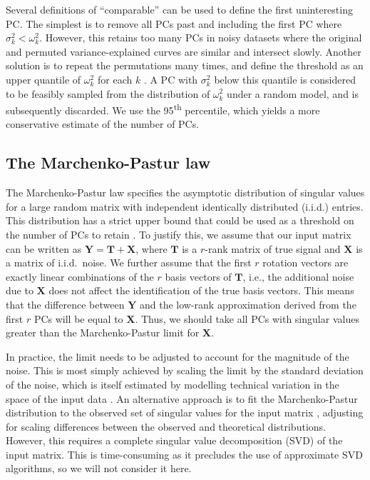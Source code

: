 \documentclass[10pt,letterpaper]{article}
\begin{document}
Several definitions of ``comparable'' can be used to define the first uninteresting PC.
The simplest is to remove all PCs past and including the first PC where $\sigma^2_k < \omega^2_k$.
However, this retains too many PCs in noisy datasets where the original and permuted variance-explained curves are similar and intersect slowly.
Another solution is to repeat the permutations many times, and define the threshold as an upper quantile of $\omega^2_k$ for each $k$ \cite{buja1992remarks}.
A PC with $\sigma^2_k$ below this quantile is considered to be feasibly sampled from the distribution of $\omega^2_k$ under a random model, and is subsequently discarded.
We use the 95\textsuperscript{th} percentile, which yields a more conservative estimate of the number of PCs.

\subsection{The Marchenko-Pastur law}
The Marchenko-Pastur law \cite{marchenko1967distribution} specifies the asymptotic distribution of singular values for a large random matrix with independent identically distributed (i.i.d.) entries.
This distribution has a strict upper bound that could be used as a threshold on the number of PCs to retain \cite{shekhar2016comprehensive}.
To justify this, we assume that our input matrix can be written as $\mathbf{Y} = \mathbf{T} + \mathbf{X}$, where $\mathbf{T}$ is a $r$-rank matrix of true signal and $\mathbf{X}$ is a matrix of i.i.d.\ noise.
We further assume that the first $r$ rotation vectors are exactly linear combinations of the $r$ basis vectors of $\mathbf{T}$,
i.e., the additional noise due to $\mathbf{X}$ does not affect the identification of the true basis vectors.
This means that the difference between $\mathbf{Y}$ and the low-rank approximation derived from the first $r$ PCs will be equal to $\mathbf{X}$.
Thus, we should take all PCs with singular values greater than the Marchenko-Pastur limit for $\mathbf{X}$.

In practice, the limit needs to be adjusted to account for the magnitude of the noise.
This is most simply achieved by scaling the limit by the standard deviation of the noise, 
which is itself estimated by modelling technical variation in the space of the input data \cite{lun2016stepbystep}.
An alternative approach is to fit the Marchenko-Pastur distribution to the observed set of singular values for the input matrix \cite{shekhar2016comprehensive},
adjusting for scaling differences between the observed and theoretical distributions.
However, this requires a complete singular value decomposition (SVD) of the input matrix.
This is time-consuming as it precludes the use of approximate SVD algorithms, so we will not consider it here.
\end{document}
